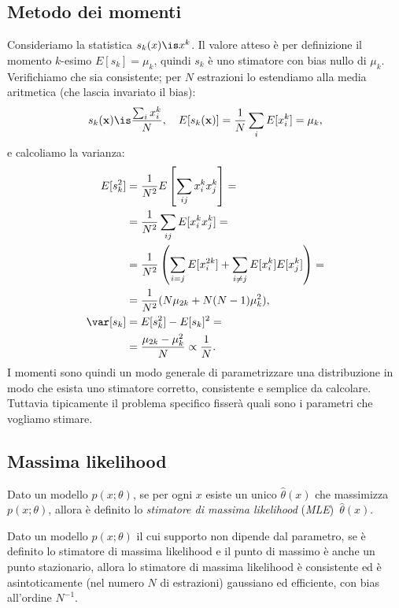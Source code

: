 
\subsection{Metodo dei momenti}

Consideriamo la statistica $s_k(x)\is x^k$.
Il valore atteso è per definizione il momento $k$-esimo
$E[s_k]=\mu_k$,
quindi $s_k$ è uno stimatore con bias nullo di $\mu_k$.
Verifichiamo che sia consistente;
per $N$ estrazioni lo estendiamo alla media aritmetica (che lascia invariato il bias):
\begin{align*}
	s_k(\mathbf x)
	\is \frac{\sum_i x_i^k}N, \quad
	E[s_k(\mathbf x)]
	= \frac1N \sum_i E[x_i^k]
	= \mu_k,
\end{align*}
e calcoliamo la varianza:
\begin{align*}
	E[s_k^2]
	&= \frac1{N^2} E \left[ \sum_{ij} x_i^k x_j^k \right] = \\
	&= \frac1{N^2} \sum_{ij} E[x_i^k x_j^k] = \\
	&= \frac1{N^2} \left( \sum_{i=j} E[x_i^{2k}] + \sum_{i\neq j} E[x_i^k] E[x_j^k] \right) = \\
	&= \frac1{N^2} (N\mu_{2k} + N(N-1)\mu_k^2), \\
	\var[s_k]
	&= E[s_k^2] - E[s_k]^2 = \\
	&= \frac{\mu_{2k} - \mu_k^2}N
	\propto \frac1N.
\end{align*}
I momenti sono quindi un modo generale di parametrizzare una distribuzione in modo che esista uno stimatore corretto, consistente e semplice da calcolare.
Tuttavia tipicamente il problema specifico fisserà quali sono i parametri che vogliamo stimare.

\subsection{Massima likelihood}
\label{sec:ml}

\begin{definition}
	Dato un modello $p(x;\theta)$,
	se per ogni $x$ esiste un unico $\hat\theta(x)$ che massimizza $p(x;\theta)$,
	allora è definito lo \emph{stimatore di massima likelihood} (\emph{MLE})~$\hat\theta(x)$.
\end{definition}

\begin{theorem}
	Dato un modello $p(x;\theta)$ il cui supporto non dipende dal parametro,
	se è definito lo stimatore di massima likelihood
	e il punto di massimo è anche un punto stazionario,
	allora lo stimatore di massima likelihood è consistente
	ed è asintoticamente (nel numero $N$ di estrazioni) gaussiano ed efficiente,
	con bias all'ordine $N^{-1}$.
\end{theorem}

